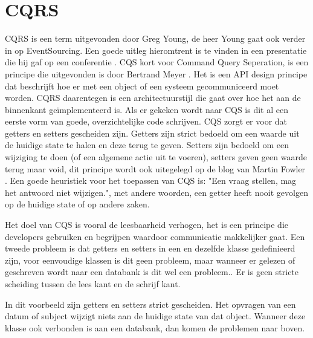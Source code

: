 
\chapter{CQRS}
\label{ch:CQRS}

CQRS is een term uitgevonden door Greg Young, de heer Young gaat ook verder in op EventSourcing. Een goede uitleg hieromtrent is te vinden in een presentatie die hij gaf op een conferentie \autocite{Young2014CQRSandES}. CQS kort voor Command Query Seperation, is een principe die uitgevonden is door Bertrand Meyer \autocite{Meyer1988}. Het is een API design principe dat beschrijft hoe er met een object of een systeem gecommuniceerd moet worden. CQRS daarentegen is een architectuurstijl die gaat over hoe het aan de binnenkant geïmplementeerd is. Als er gekeken wordt naar CQS is dit al een eerste vorm van goede, overzichtelijke code schrijven. CQS zorgt er voor dat getters en setters gescheiden zijn. Getters zijn strict bedoeld om een waarde uit de huidige state te halen en deze terug te geven. Setters zijn bedoeld om een wijziging te doen (of een algemene actie uit te voeren), setters geven geen waarde terug maar void, dit principe wordt ook uitegelegd op de blog van Martin Fowler \autocite{Fowler2005CQS}. Een goede heuristiek voor het toepassen van CQS is: "Een vraag stellen, mag het antwoord niet wijzigen.", met andere woorden, een getter heeft nooit gevolgen op de huidige state of op andere zaken.

Het doel van CQS is vooral de leesbaarheid verhogen, het is een principe die developers gebruiken en begrijpen waardoor communicatie makkelijker gaat.
Een tweede probleem is dat getters en setters in een en dezelfde klasse gedefinieerd zijn, voor eenvoudige klassen is dit geen probleem, maar wanneer er gelezen of geschreven wordt naar een databank is dit wel een probleem.. Er is geen stricte scheiding tussen de lees kant en de schrijf kant.


In dit voorbeeld zijn getters en setters strict gescheiden. Het opvragen van een datum of subject wijzigt niets aan de huidige state van dat object. Wanneer deze klasse ook verbonden is aan een databank, dan komen de problemen naar boven.


